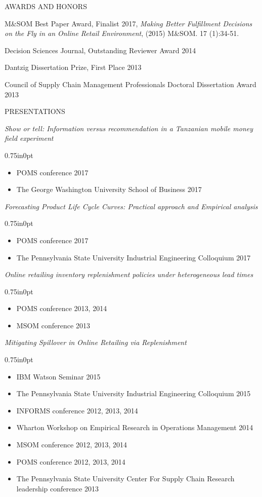 \documentclass[letterpaper,11pt,oneside]{article}
\newcommand\myIndent{0.75in}
\newcommand\myParSkip{3pt}
\newcommand\myHangIndent{1in}
\newcommand\mySpaceBeforeSection{0.9em}
\newcommand\mySpaceBeforeSectionAfterBib{0em}
\newcommand{\NiceIndent}{ \parindent=\myIndent \hangindent=\myHangIndent }
\newenvironment{miniListBullet}
    {
        \begin{adjustwidth}{\myIndent}{0pt}
        \setlength{\parskip}{0pt}%
        \renewcommand\labelitemi{{\boldmath$\cdot$}}
        \begin{itemize}
        \setlength\itemsep{0em}
    }
    {
        \end{itemize}
        \setlength{\parskip}{\myParSkip}%
        \end{adjustwidth}
    }
\begin{document}
\vspace{\mySpaceBeforeSectionAfterBib}

\noindent AWARDS AND HONORS

\NiceIndent M\&SOM Best Paper Award, Finalist 2017, \textit{Making Better Fulfillment Decisions on the Fly in an Online Retail Environment}, (2015) M\&SOM. 17 (1):34-51.

\NiceIndent Decision Sciences Journal, Outstanding Reviewer Award 2014

\NiceIndent Dantzig Dissertation Prize, First Place 2013

\NiceIndent Council of Supply Chain Management Professionals Doctoral Dissertation Award 2013


\vspace{\mySpaceBeforeSection}

\noindent PRESENTATIONS


\NiceIndent \textit{Show or tell: Information versus recommendation in a {Tanzanian} mobile money field experiment}
\begin{miniListBullet}
    \item POMS conference 2017
    \item The George Washington University School of Business 2017
\end{miniListBullet}

\NiceIndent \textit{Forecasting Product Life Cycle Curves: Practical approach and Empirical analysis}
\begin{miniListBullet}
    \item POMS conference 2017
    \item The Pennsylvania State University Industrial Engineering Colloquium 2017
\end{miniListBullet}

\NiceIndent \textit{Online retailing inventory replenishment policies under heterogeneous lead times}
\begin{miniListBullet}
    \item POMS conference 2013, 2014
    \item MSOM conference 2013
\end{miniListBullet}

\NiceIndent \textit{Mitigating Spillover in Online Retailing via Replenishment}
\begin{miniListBullet}
    \item IBM Watson Seminar 2015
    \item The Pennsylvania State University Industrial Engineering Colloquium 2015
    \item INFORMS conference 2012, 2013, 2014
    \item Wharton Workshop on Empirical Research in Operations Management 2014
    \item MSOM conference 2012, 2013, 2014
    \item POMS conference 2012, 2013, 2014
    \item The Pennsylvania State University Center For Supply Chain Research leadership conference 2013
\end{miniListBullet}
\end{document}
